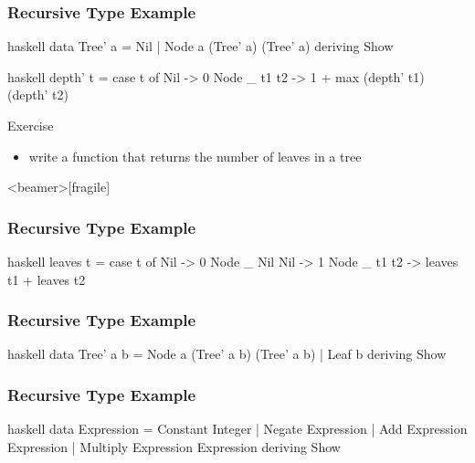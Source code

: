 \documentclass[dvipsnames]{beamer}
\theoremstyle{plain}
\begin{document}
\begin{frame}[fragile]
  \frametitle{Recursive Type Example}

  \begin{example}
    \begin{pygments}{haskell}
data Tree' a = Nil | Node a (Tree' a) (Tree' a)
               deriving Show
    \end{pygments}

    \pause
    \begin{pygments}{haskell}
depth' t =
    case t of
      Nil -> 0
      Node _ t1 t2 -> 1 + max (depth' t1) (depth' t2)
    \end{pygments}
  \end{example}

  \pause
  \begin{block}{Exercise}
    \begin{itemize}
      \item write a function that returns the number of leaves in a tree
    \end{itemize}
  \end{block}
\end{frame}

\begin{frame}<beamer>[fragile]
  \frametitle{Recursive Type Example}

  \begin{example}
    \pause
    \begin{pygments}{haskell}
leaves t =
    case t of
      Nil -> 0
      Node _ Nil Nil -> 1
      Node _ t1 t2 -> leaves t1 + leaves t2
    \end{pygments}
  \end{example}
\end{frame}

\begin{frame}[fragile]
  \frametitle{Recursive Type Example}

  \begin{example}
    \begin{pygments}{haskell}
data Tree' a b =
    Node a (Tree' a b) (Tree' a b)
  | Leaf b
  deriving Show
    \end{pygments}
  \end{example}
\end{frame}

\begin{frame}[fragile]
  \frametitle{Recursive Type Example}

  \begin{example}
    \begin{pygments}{haskell}
data Expression = Constant Integer
                | Negate Expression
                | Add Expression Expression
                | Multiply Expression Expression
                deriving Show
    \end{pygments}
  \end{example}
\end{frame}
\end{document}
